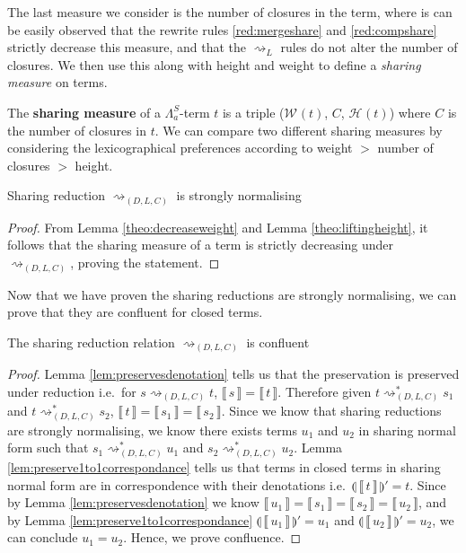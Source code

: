 \documentclass[a4paper,UKenglish,cleveref, autoref]{lipics-v2019}
\newcommand\defn{\textbf}
\newcommand{\FALC}{\Lambda^{S}_{a}}
\newcommand{\readback}[2]{\llbracket \, #1 \, \rrbracket}
\newcommand{\compile}[1]{\llparenthesis \, #1 \, \rrparenthesis}
\newcommand{\height}[2]{\mathcal{H}^{#1}(#2)}
\newcommand{\weight}[2]{\mathcal{W}^{#1}(#2)}
\begin{document}
The last measure we consider is the number of closures in the term, where is can be easily observed that the rewrite rules \ref{red:mergeshare} and \ref{red:compshare} strictly decrease this measure, and that the $\rightsquigarrow_{L}$ rules do not alter the number of closures. We then use this along with height and weight to define a \emph{sharing measure} on terms.

\begin{definition}
\label{def:sharingmeasure}
The \defn{sharing measure} of a $\FALC$-term $t$ is a triple ($\weight{}{t}$, $C$, $\height{}{t}$) where $C$ is the number of closures in $t$. We can compare two different sharing measures by considering the lexicographical preferences according to weight $>$ number of closures $>$ height.
\end{definition}

\begin{theorem}
\label{theo:sharingstronglynormal}
Sharing reduction $\rightsquigarrow_{(D, L, C)}$ is strongly normalising
\end{theorem}
\begin{proof}
From Lemma \ref{theo:decreaseweight} and Lemma \ref{theo:liftingheight}, it follows that the sharing measure of a term is strictly decreasing under $\rightsquigarrow_{(D, L, C)}$, proving the statement.
\end{proof}

\noindent Now that we have proven the sharing reductions are strongly normalising, we can prove that they are confluent for closed terms.

\begin{theorem}
\label{theo:strongnormal}
The sharing reduction relation $\rightsquigarrow_{(D, L, C)}$ is confluent
\end{theorem}
\begin{proof}
 Lemma \ref{lem:preservesdenotation} tells us that the preservation is preserved under reduction i.e.\ for $s \rightsquigarrow_{(D, L, C)} t$, $\readback{s}{} = \readback{t}{}$. Therefore given $t \rightsquigarrow^{*}_{(D, L, C)} s_{1}$ and $t \rightsquigarrow^{*}_{(D, L, C)} s_{2}$, $\readback{t}{} = \readback{s_{1}}{} = \readback{s_{2}}{}$. Since we know that sharing reductions are strongly normalising, we know there exists terms $u_{1}$ and $u_{2}$ in sharing normal form such that $s_{1} \rightsquigarrow^{*}_{(D, L, C)} u_{1}$ and $s_{2} \rightsquigarrow^{*}_{(D, L, C)} u_{2}$. Lemma \ref{lem:preserve1to1correspondance} tells us that terms in closed terms in sharing normal form are in correspondence with their denotations i.e.\ $ \compile{\readback{t}{I}}' = t $. Since by Lemma \ref{lem:preservesdenotation} we know $\readback{u_{1}}{} = \readback{s_{1}}{} = \readback{s_{2}}{} = \readback{u_{2}}{}$, and by Lemma \ref{lem:preserve1to1correspondance} $ \compile{\readback{u_{1}}{I}}' = u_{1} $ and $\compile{\readback{u_{2}}{I}}' = u_{2}$, we can conclude $u_{1} = u_{2}$. Hence, we prove confluence.
\end{proof}
\end{document}

